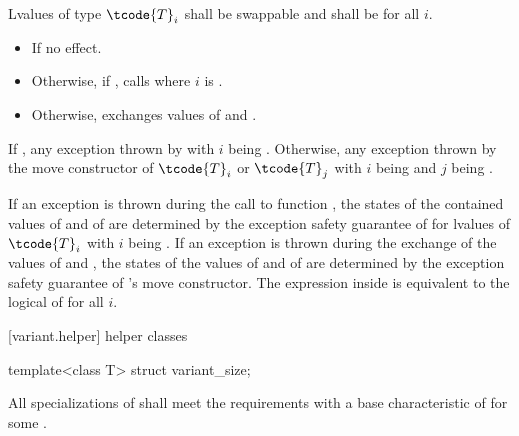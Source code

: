 \begin{itemdescr}
\pnum
\requires Lvalues of type $\tcode{T}_i$ shall be swappable and
 shall be  for all $i$.

\pnum
\effects
\begin{itemize}
\item
If  no effect.
\item
Otherwise, if , calls  where $i$ is .
\item
Otherwise, exchanges values of  and .
\end{itemize}

\pnum
\throws
If ,
any exception thrown by 
with $i$ being .
Otherwise, any exception thrown by the move constructor
of $\tcode{T}_i$ or $\tcode{T}_j$
with $i$ being  and $j$ being .

\pnum
\remarks
If an exception is thrown during the call to function ,
the states of the contained values of  and of  are
determined by the exception safety guarantee of  for lvalues of
$\tcode{T}_i$ with $i$ being .
If an exception is thrown during the exchange of the values of 
and , the states of the values of  and of 
are determined by the exception safety guarantee of 's move constructor.
The expression inside  is equivalent to the logical  of
 for all $i$.
\end{itemdescr}

[variant.helper]{ helper classes}

%
\begin{itemdecl}
template<class T> struct variant_size;
\end{itemdecl}

\begin{itemdescr}
\pnum
\remarks
All specializations of  shall meet the
 requirements
with a base characteristic of  for some .
\end{itemdescr}

